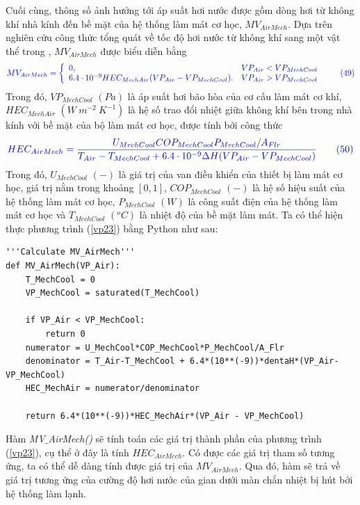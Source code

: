 \documentclass[13pt,a4paper]{article}
\begin{document}
			Cuối cùng, thông số ảnh hưởng tới áp suất hơi nước được gồm dòng hơi từ không khí nhà kính đến bề mặt của hệ thống làm mát cơ học, $MV_{AirMech}$. Dựa trên nghiên cứu công thức tổng quát về tốc độ hơi nước từ không khí sang một vật thể trong \cite{Van11},  $MV_{AirMech}$ được biểu diễn bằng
			\begin{align}
				\color{blue}
				MV_{AirMech} = \left\{\begin{array}{llr}
					0,& VP_{Air} < VP_{MechCool} \\
					6.4\cdot 10^{-9} HEC_{MechAir}(VP_{Air} - VP_{MechCool}).& VP_{Air} > VP_{MechCool}
				\end{array}\right.
				\color{blue}
				\tag{49}\label{vp23}
			\end{align}
			Trong đó, $VP_{MechCool}$ $(Pa)$ là áp suất hơi bão hòa của cơ cấu làm mát cơ khí, $HEC_{MechAir}$ $(W\ m^{-2}\ K^{-1})$ là hệ số trao đổi nhiệt giữa không khí bên trong nhà kính với bề mặt của bộ làm mát cơ học, được tính bởi công thức
			\begin{align}
				\color{blue}
					HEC_{AirMech} = \dfrac{U_{MechCool}COP_{MechCool}P_{MechCool}/A_{Flr}}{T_{Air} - T_{MechCool} +6.4\cdot 10^{-9}\Delta H (VP_{Air} - VP_{MechCool})}
				\color{blue}
				\tag{50}\label{vp24}
			\end{align}
			Trong đó, $U_{MechCool}$ $(-)$ là giá trị của van điều khiển của thiết bị làm mát cơ học, giá trị nằm trong khoảng $[0,1]$, $COP_{MechCool}$ $(-)$ là hệ số hiệu suất của hệ thống làm mát cơ học, $P_{MechCool}$ $(W)$ là công suất điện của hệ thống làm mát cơ học và $T_{MechCool}$ $(^oC)$ là nhiệt độ của bề mặt làm mát.
			Ta có thể hiện thực phương trình (\ref{vp23}) bằng Python như sau:
\begin{lstlisting}
'''Calculate MV_AirMech'''
def MV_AirMech(VP_Air):
	T_MechCool = 0
	VP_MechCool = saturated(T_MechCool) 
	
	if VP_Air < VP_MechCool:
		return 0
	numerator = U_MechCool*COP_MechCool*P_MechCool/A_Flr
	denominator = T_Air-T_MechCool + 6.4*(10**(-9))*dentaH*(VP_Air-VP_MechCool)
	HEC_MechAir = numerator/denominator
	
	return 6.4*(10**(-9))*HEC_MechAir*(VP_Air - VP_MechCool)
\end{lstlisting}
	Hàm \textit{MV$\_$AirMech()} sẽ tính toán các giá trị thành phần của phương trình (\ref{vp23}), cụ thể ở đây là tính $HEC_{AirMech}$. Có được các giá trị tham số tương ứng, ta có thể dễ dàng tính được giá trị của $MV_{AirMech}$. Qua đó, hàm sẽ trả về giá trị tương ứng của cường độ hơi nước của gian dưới màn chắn nhiệt bị hút bởi hệ thống làm lạnh.
	
\end{document}
